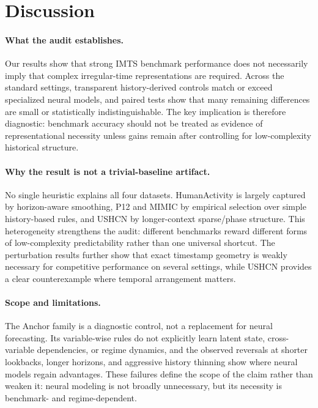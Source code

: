 \documentclass{article}
\begin{document}
\section{Discussion}

\paragraph{What the audit establishes.}
Our results show that strong IMTS benchmark performance does not necessarily imply that complex irregular-time representations are required. Across the standard settings, transparent history-derived controls match or exceed specialized neural models, and paired tests show that many remaining differences are small or statistically indistinguishable. The key implication is therefore diagnostic: benchmark accuracy should not be treated as evidence of representational necessity unless gains remain after controlling for low-complexity historical structure.

\paragraph{Why the result is not a trivial-baseline artifact.}
No single heuristic explains all four datasets. HumanActivity is largely captured by horizon-aware smoothing, P12 and MIMIC by empirical selection over simple history-based rules, and USHCN by longer-context sparse/phase structure. This heterogeneity strengthens the audit: different benchmarks reward different forms of low-complexity predictability rather than one universal shortcut. The perturbation results further show that exact timestamp geometry is weakly necessary for competitive performance on several settings, while USHCN provides a clear counterexample where temporal arrangement matters.

\paragraph{Scope and limitations.}
The Anchor family is a diagnostic control, not a replacement for neural forecasting. Its variable-wise rules do not explicitly learn latent state, cross-variable dependencies, or regime dynamics, and the observed reversals at shorter lookbacks, longer horizons, and aggressive history thinning show where neural models regain advantages. These failures define the scope of the claim rather than weaken it: neural modeling is not broadly unnecessary, but its necessity is benchmark- and regime-dependent.
\end{document}
